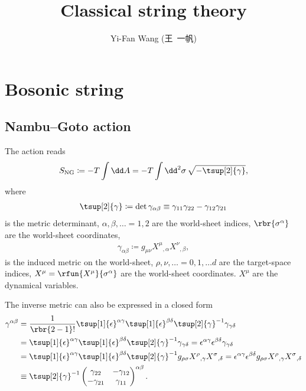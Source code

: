 \documentclass[a4paper,11pt]{article}
\title{Classical string theory}
\author{Yi-Fan Wang (王\ 一帆)}
\begin{document}
\maketitle

\section{Bosonic string}
\label{sec:bos-str}

\subsection{Nambu--Goto action}
\label{sec:bos-str-nam}

The action reads \cite{Nambu1970a,Goto1971}
\begin{align}
S_{\text{NG}} \coloneqq -T \int \dd A = 
-T \int \dd^2 \sigma\,\sqrt{-\tsup[2]{\gamma}},
\end{align}
where
\begin{align}
\tsup[2]{\gamma} \coloneqq \det \gamma_{\alpha\beta} \equiv
\gamma_{11}\gamma_{22} - \gamma_{12}\gamma_{21}
\end{align}
is the metric determinant, $\alpha, \beta, \ldots = 1, 2$ are the world-sheet 
indices, $\rbr{\sigma^\alpha}$ are the world-sheet coordinates, 
\begin{align}
\gamma_{\alpha\beta} \coloneqq g_{\mu\nu} 
X^{\mu}{}_{,\alpha} X^{\nu}{}_{,\beta},
\end{align}
is the induced metric on the world-sheet, $\rho, \nu, \ldots = 0, 1, \ldots d$ 
are the target-space indices, $X^{\mu} = \rfun{X^{\mu}}{\sigma^{\alpha}}$ are 
the world-sheet coordinates. $X^{\mu}$ are the dynamical variables.

The inverse metric can also be expressed in a closed form
\begin{align}
\gamma^{\alpha\beta} &= \frac{1}{\rbr{2-1}!} 
	\tsup[1]{\epsilon}^{\alpha\gamma} \tsup[1]{\epsilon}^{\beta\delta} 
	\tsup[2]{\gamma}^{-1} \gamma_{\gamma\delta}
\nonumber \\
&=
	\tsup[1]{\epsilon}^{\alpha\gamma} \tsup[1]{\epsilon}^{\beta\delta} 
	\tsup[2]{\gamma}^{-1} \gamma_{\gamma\delta} =
	\epsilon^{\alpha\gamma} \epsilon^{\beta\delta} \gamma_{\gamma\delta}
\\
&=
\tsup[1]{\epsilon}^{\alpha\gamma} \tsup[1]{\epsilon}^{\beta\delta} 
	\tsup[2]{\gamma}^{-1} g_{\rho\sigma} 
	X^{\rho}{}_{,\gamma} X^{\sigma}{}_{,\delta} =
\epsilon^{\alpha\gamma} \epsilon^{\beta\delta} g_{\rho\sigma} 
	X^{\rho}{}_{,\gamma} X^{\sigma}{}_{,\delta}
\\
&\equiv \tsup[2]{\gamma}^{-1}
\begin{pmatrix}
\gamma_{22} & -\gamma_{12} \\ -\gamma_{21} & \gamma_{11}
\end{pmatrix}^{\alpha\beta}.
\end{align}
\end{document}
